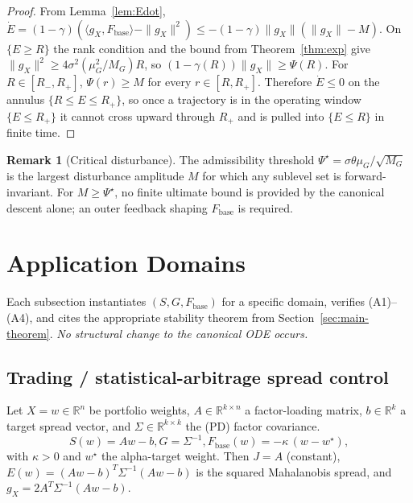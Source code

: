 \documentclass[11pt,oneside]{amsart}
\def\qquad{ }%
\theoremstyle{plain}
\theoremstyle{definition}
\newtheorem{remark}[theorem]{Remark}
\newcommand{\gX}{g_X}
\newcommand{\Fbase}{F_{\mathrm{base}}}
\newcommand{\R}{\mathbb{R}}
\begin{document}
\begin{proof}
From Lemma~\ref{lem:Edot}, $\dot E = (1-\gamma)(\langle \gX,\Fbase\rangle - \|\gX\|^{2})
\le -(1-\gamma)\|\gX\|(\|\gX\|-M)$. On $\{E\ge R\}$ the rank condition
and the bound from Theorem~\ref{thm:exp} give
$\|\gX\|^{2}\ge 4\sigma^{2}(\mu_{G}^{2}/M_{G})R$, so
$(1-\gamma(R))\|\gX\|\ge \Psi(R)$. For $R\in[R_{-},R_{+}]$,
$\Psi(r)\ge M$ for every $r\in[R,R_{+}]$. Therefore $\dot E\le 0$ on
the annulus $\{R\le E\le R_{+}\}$, so once a trajectory is in the
operating window $\{E\le R_{+}\}$ it cannot cross upward through
$R_{+}$ and is pulled into $\{E\le R\}$ in finite time.
\end{proof}

\begin{remark}[Critical disturbance]
The admissibility threshold $\Psi^{\star}=\sigma\theta\mu_{G}/\sqrt{M_{G}}$
is the largest disturbance amplitude $M$ for which any sublevel set
is forward-invariant. For $M\ge\Psi^{\star}$, no finite ultimate
bound is provided by the canonical descent alone; an outer feedback
shaping $\Fbase$ is required.
\end{remark}

\section{Application Domains}
\label{sec:applications}

Each subsection instantiates $(S,G,\Fbase)$ for a specific domain,
verifies (A1)--(A4), and cites the appropriate stability theorem from
Section~\ref{sec:main-theorem}. \emph{No structural change to the
canonical ODE occurs.}

\subsection{Trading / statistical-arbitrage spread control}
\label{sec:app-trading}

Let $X = w \in \R^{n}$ be portfolio weights, $A\in\R^{k\times n}$ a
factor-loading matrix, $b\in\R^{k}$ a target spread vector, and
$\Sigma\in\R^{k\times k}$ the (PD) factor covariance.
\[
  S(w) = Aw - b,\qquad
  G = \Sigma^{-1},\qquad
  \Fbase(w) = -\kappa\,(w - w^{\star}),
\]
with $\kappa>0$ and $w^{\star}$ the alpha-target weight.
Then $J = A$ (constant), $E(w) = (Aw-b)^{T}\Sigma^{-1}(Aw-b)$ is the
squared Mahalanobis spread, and $\gX = 2A^{T}\Sigma^{-1}(Aw-b)$.
\end{document}
